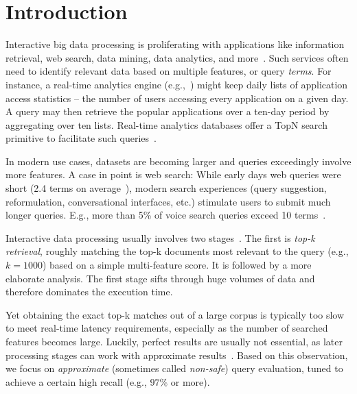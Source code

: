\section{Introduction}
\label{sec:intro}

Interactive big data processing is proliferating with  applications like
information retrieval, web search, data mining, data analytics, and more~\cite{top-k-survey}. 
Such services often need to identify relevant data based on multiple {features}, or query \emph{terms}.  
For instance, a real-time analytics engine (e.g.,~\cite{flurry}) might keep daily lists of application access statistics -- the 
number of  users accessing every application on a given day.  
A query may then retrieve the popular applications over a  ten-day period by aggregating over ten lists.
Real-time analytics databases offer a TopN search primitive to facilitate such queries~\cite{druid-topN}.

In modern use cases,  datasets are becoming larger and queries exceedingly  involve more features. 
A case in point is web search:  
While  early days web queries were short (2.4 terms on average~\cite{Spink:2001:SWP:362968.362979}), 
modern search experiences (query suggestion, reformulation, conversational interfaces, etc.) stimulate  users to submit much longer queries. 
E.g., more than 5\% of voice search queries exceed 10 terms~\cite{sigir/Guy16}. 

Interactive data processing   usually involves two stages~\cite{Wang:2011}. 
The first  is \emph{top-k retrieval}, roughly matching the top-k documents most relevant to the query
(e.g., $k=1000$) based on a simple multi-feature  score. 
It is followed by a more elaborate analysis. 
The first stage  sifts through huge volumes of data and therefore dominates the execution time. 

Yet obtaining the exact top-k matches out of a large corpus is typically too slow to meet real-time latency requirements, 
especially as the number of searched features becomes large.
Luckily, 
perfect results are usually not essential, as later  processing 
stages can work with approximate results~\cite{Crane:2017,Lin:2015,Wang:2011,druid-topN}. 
Based on this observation, we focus on \emph{approximate} 
(sometimes called \emph{non-safe}) query evaluation, tuned to achieve a certain high recall (e.g., $97\%$ or more). 

